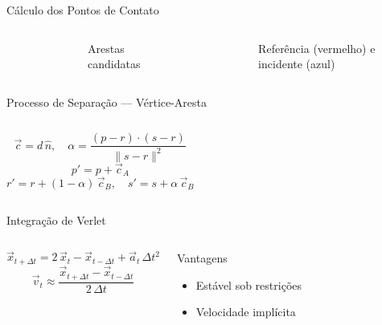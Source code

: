 \documentclass[12pt]{beamer}
\begin{document}
\begin{frame}{Cálculo dos Pontos de Contato}
  \begin{columns}[c]
      \begin{figure}
        \centering
        
      \end{figure}
      \begin{center}\small Arestas candidatas\end{center}
      \begin{figure}
        \centering
        
      \end{figure}
      \begin{center}\small Referência (vermelho) e incidente (azul)\end{center}
  \end{columns}
\end{frame}

\begin{frame}{Processo de Separação — Vértice-Aresta}
  \begin{columns}[c]
      \[
        \vec{c} = d\,\hat{n}, \quad
        \alpha = \frac{(p{-}r)\cdot(s{-}r)}{\|s{-}r\|^2}
      \]
      \[
        p' = p + \vec{c}_A
      \]
      \[
        r' = r + (1{-}\alpha)\,\vec{c}_B, \quad
        s' = s + \alpha\,\vec{c}_B
      \]
      \begin{figure}
        \centering
        
      \end{figure}
  \end{columns}
\end{frame}

\begin{frame}{Integração de Verlet}
  \begin{columns}[c]
      \[
        \vec{x}_{t+\Delta t} = 2\,\vec{x}_t - \vec{x}_{t-\Delta t}
          + \vec{a}_t\,\Delta t^2
      \]
      \[
        \vec{v}_t \approx \frac{\vec{x}_{t+\Delta t} - \vec{x}_{t-\Delta t}}{2\,\Delta t}
      \]
      \begin{exampleblock}{Vantagens}
        \begin{itemize}
          \item Estável sob restrições
          \item Velocidade implícita
        \end{itemize}
      \end{exampleblock}
  \end{columns}
\end{frame}
\end{document}
